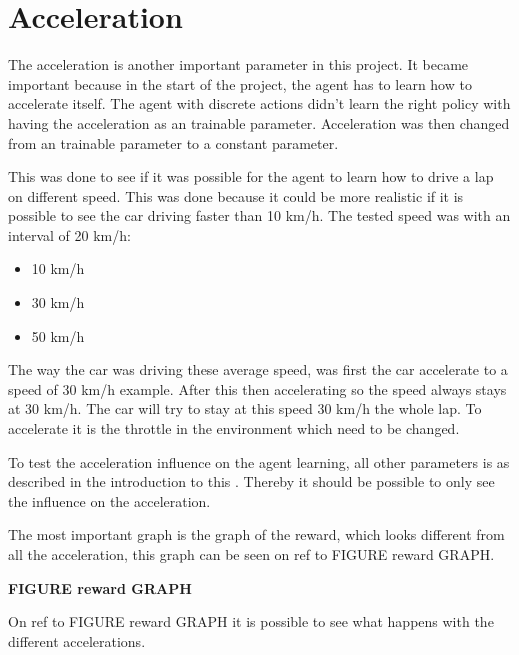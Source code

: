 \section{Acceleration}\label{sectionAcceleration}
The acceleration is another important parameter in this project. It became important because in the start of the project, the agent has to learn how to accelerate itself. The agent with discrete actions didn't learn the right policy with having the acceleration as an trainable parameter. Acceleration was then changed from an trainable parameter to a constant parameter.

This was done to see if it was possible for the agent to learn how to drive a lap on different speed. This was done because it could be more realistic if it is possible to see the car driving faster than 10 km/h. The tested speed was with an interval of 20 km/h:
\begin{itemize}
	\item 10 km/h
	\item 30 km/h
	\item 50 km/h
\end{itemize} 

The way the car was driving these average speed, was first the car accelerate to a speed of 30 km/h example. After this then accelerating so the speed always stays at 30 km/h. The car will try to stay at this speed 30 km/h the whole lap. To accelerate it is the throttle in the environment which need to be changed.

To test the acceleration influence on the agent learning, all other parameters is as described in the introduction to this . Thereby it should be possible to only see the influence on the acceleration.

The most important graph is the graph of the reward, which looks different from all the acceleration, this graph can be seen on {ref to FIGURE reward GRAPH}.


\textbf{FIGURE reward GRAPH}  


On {ref to FIGURE reward GRAPH} it is possible to see what happens with the different accelerations.   
 

  